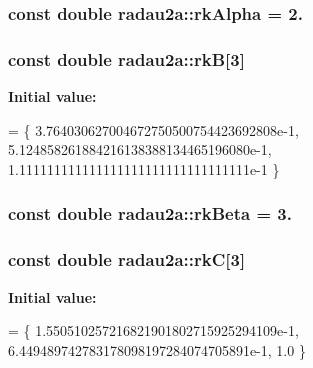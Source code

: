 \subsubsection[{\texorpdfstring{rk\+Alpha}{rkAlpha}}]{\setlength{\rightskip}{0pt plus 5cm}const double radau2a\+::rk\+Alpha = 2.\hspace{0.3cm}{\ttfamily [static]}}\hypertarget{group__Parameters_gab60c47377f4985db23effa46e2239c24}{}\label{group__Parameters_gab60c47377f4985db23effa46e2239c24}
\subsubsection[{\texorpdfstring{rkB}{rkB}}]{\setlength{\rightskip}{0pt plus 5cm}const double radau2a\+::rkB\mbox{[}3\mbox{]}\hspace{0.3cm}{\ttfamily [static]}}\hypertarget{group__Parameters_gaefb80779066572ac8b1e549cf1293de1}{}\label{group__Parameters_gaefb80779066572ac8b1e549cf1293de1}
{\bfseries Initial value\+:}
\begin{DoxyCode}
= \{
3.764030627004672750500754423692808e-1,
5.124858261884216138388134465196080e-1,
1.111111111111111111111111111111111e-1
\}
\end{DoxyCode}
\subsubsection[{\texorpdfstring{rk\+Beta}{rkBeta}}]{\setlength{\rightskip}{0pt plus 5cm}const double radau2a\+::rk\+Beta = 3.\hspace{0.3cm}{\ttfamily [static]}}\hypertarget{group__Parameters_ga9a1ddba0cd8b29630b2c005af061c656}{}\label{group__Parameters_ga9a1ddba0cd8b29630b2c005af061c656}
\subsubsection[{\texorpdfstring{rkC}{rkC}}]{\setlength{\rightskip}{0pt plus 5cm}const double radau2a\+::rkC\mbox{[}3\mbox{]}\hspace{0.3cm}{\ttfamily [static]}}\hypertarget{group__Parameters_ga7e8fecc1a981ceff1796a595b0ef5b4a}{}\label{group__Parameters_ga7e8fecc1a981ceff1796a595b0ef5b4a}
{\bfseries Initial value\+:}
\begin{DoxyCode}
= \{
1.550510257216821901802715925294109e-1,
6.449489742783178098197284074705891e-1,
1.0
\}
\end{DoxyCode}
